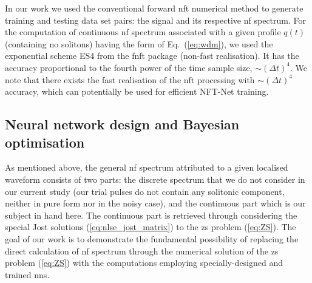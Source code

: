 In our work we used the conventional forward \acrshort{nft} numerical method to generate training and testing data set pairs: the signal and its respective \acrshort{nf} spectrum. %
For the computation of continuous \acrshort{nf} spectrum associated with a given profile $q(t)$ (containing no solitons) having the form of Eq.~(\ref{eq:wdm}), we used the exponential scheme ES4 from the \acrshort{fnft} package\cite{FNFT2018} (non-fast realisation). It has the accuracy proportional to the fourth power of the time sample size, $\sim (\Delta t)^4$. We note that there exists the fast realisation of the \acrshort{nft} processing with $\sim (\Delta t)^4$ accuracy\cite{medvedev2020exponential}, which can potentially be used for efficient NFT-Net training.



\subsection{Neural network design and Bayesian optimisation}


As mentioned above, the general \acrshort{nf} spectrum attributed to a given localised waveform consists of two parts: the discrete spectrum that we do not consider in our current study (our trial pulses do not contain any solitonic component, neither in pure form nor in the noisy case), and the continuous part which is our subject in hand here. The continuous part is retrieved through considering the special Jost solutions (\ref{eq:nlse_jost_matrix}) to the \acrshort{zs} problem (\ref{eq:ZS}). The goal of our work is to demonstrate the fundamental possibility of replacing the direct calculation of \acrshort{nf} spectrum through the numerical solution of the \acrshort{zs} problem (\ref{eq:ZS}) with the computations employing specially-designed and trained \acrshort{nn}s.

